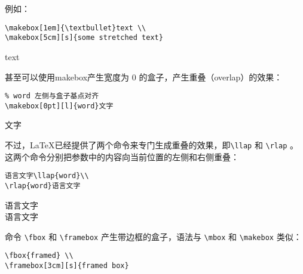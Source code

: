例如：

\begin{minipage}[t]{0.45\textwidth}
\begin{lstlisting}
\makebox[1em]{\textbullet}text \\
\makebox[5cm][s]{some stretched text}
\end{lstlisting}
\end{minipage}
\hfill
\begin{minipage}[t]{0.45\textwidth}
\makebox[1em]{\textbullet}text \\
\end{minipage}

甚至可以使用makebox产生宽度为 0 的盒子，产生重叠（overlap）的效果：

\begin{minipage}[t]{0.45\textwidth}
\begin{lstlisting}
% word 左侧与盒子基点对齐
\makebox[0pt][l]{word}文字
\end{lstlisting}
\end{minipage}
\hfill
\begin{minipage}[t]{0.45\textwidth}
文字
\end{minipage}

不过，\LaTeX 已经提供了两个命令来专门生成重叠的效果，即\verb|\llap| 和 \verb|\rlap| 。这两个命令分别把参数中的内容向当前位置的左侧和右侧重叠：

\begin{minipage}[t]{0.45\textwidth}
\begin{lstlisting}
语言文字\llap{word}\\
\rlap{word}语言文字
\end{lstlisting}
\end{minipage}
\hfill
\begin{minipage}[t]{0.45\textwidth}
语言文字\\
语言文字
\end{minipage}

命令 \verb|\fbox| 和 \verb|\framebox| 产生带边框的盒子，语法与 \verb|\mbox| 和 \verb|\makebox| 类似：

\begin{minipage}[t]{0.45\textwidth}
\begin{lstlisting}
\fbox{framed} \\
\framebox[3cm][s]{framed box}    
\end{lstlisting}
\end{minipage}
\hfill
\begin{minipage}[t]{0.45\textwidth}
 \\
\end{minipage}

